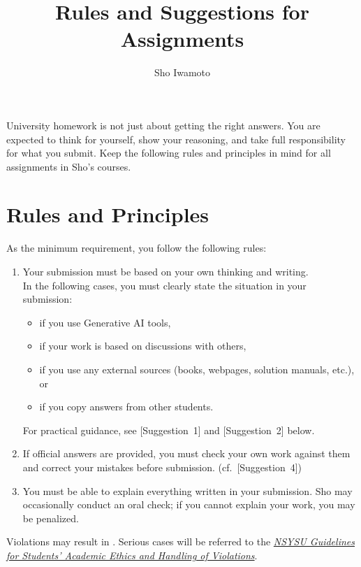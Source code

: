 \documentclass[11pt,pdfa,lastpage,minititle]{MishoNote}
\title{Rules and Suggestions for Assignments}
\author{Sho Iwamoto}
\def\RL#1{\Emph*{[#1]~~}}
\def\SUG#1{\textsf{[Suggestion~#1]}}
\begin{document}
\maketitle

University homework is not just about getting the right answers.
You are expected to think for yourself, show your reasoning, and take full responsibility for what you submit.
Keep the following rules and principles in mind for all assignments in Sho's courses.


\section*{Rules and Principles}
As the minimum requirement, you  follow the following rules:
\begin{tcolorbox}[myitembox]
\begin{enumerate}[leftmargin=3em,label=\Emph*{Rule \arabic*.}]
  \item \RL{Authorship} Your submission must be based on your own thinking and writing.
  \\In the following cases, you must clearly state the situation in your submission:
\begin{itemize}[leftmargin=1em]
  \item if you use Generative AI tools,
  \item if your work is based on discussions with others,
  \item if you use any external sources (books, webpages, solution manuals, etc.), or
  \item if you copy answers from other students.
  \end{itemize}
  For practical guidance, see \SUG{1} and \SUG{2} below.
  \item \RL{Self-correction} If official answers are provided, you must check your own work against them and correct your mistakes before submission. (cf.~\SUG{4})
  \item \RL{Understanding} You must be able to explain everything written in your submission. Sho may occasionally conduct an oral check; if you cannot explain your work, you may be penalized.
\end{enumerate}
\end{tcolorbox}
Violations may result in .
Serious cases will be referred to the \href{https://oaa.nsysu.edu.tw/var/file/3/1003/img/1296/acade_rule_27.pdf}{\em NSYSU Guidelines for Students' Academic Ethics and Handling of Violations}.
\end{document}
